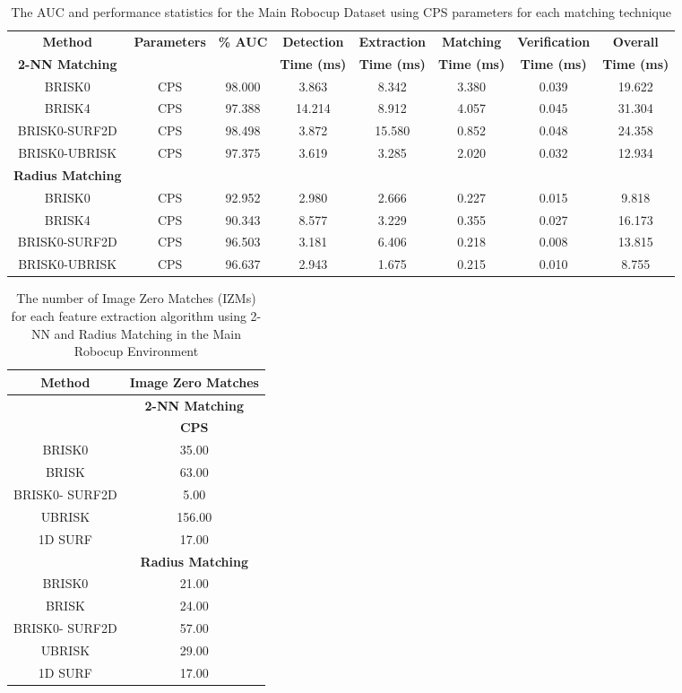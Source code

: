 \documentclass[11pt]{report}
\begin{document}
\begin{table}


\caption{The AUC and performance statistics for the Main Robocup Dataset using
CPS parameters for each matching technique}

\footnotesize
\begin{tabular}{|c|c|c|c|c|c|c|c|}
\hline 
\textbf{Method } & \textbf{Parameters} & \textbf{\% AUC} & \textbf{Detection} & \textbf{Extraction} & \textbf{Matching} & \textbf{Verification} & \textbf{Overall}\tabularnewline
\textbf{2-NN Matching} &  &  & \textbf{Time (ms)} & \textbf{Time (ms)} & \textbf{Time (ms)} & \textbf{Time (ms)} & \textbf{Time (ms)}\tabularnewline
\hline 
\hline 
BRISK0 & CPS & 98.000 & 3.863 & 8.342 & 3.380 & 0.039 & 19.622\tabularnewline
\hline 
BRISK4 & CPS & 97.388 & 14.214 & 8.912 & 4.057 & 0.045 & 31.304\tabularnewline
\hline 
BRISK0-SURF2D & CPS & 98.498 & 3.872 & 15.580 & 0.852 & 0.048 & 24.358\tabularnewline
\hline 
BRISK0-UBRISK & CPS & 97.375 & 3.619 & 3.285 & 2.020 & 0.032 & 12.934\tabularnewline
\hline 
\hline 
\textbf{Radius Matching} &  &  &  &  &  &  & \tabularnewline
\hline 
BRISK0 & CPS & 92.952 & 2.980 & 2.666 & 0.227 & 0.015 & 9.818\tabularnewline
\hline 
BRISK4 & CPS & 90.343 & 8.577 & 3.229 & 0.355 & 0.027 & 16.173\tabularnewline
\hline 
BRISK0-SURF2D & CPS & 96.503 & 3.181 & 6.406 & 0.218 & 0.008 & 13.815\tabularnewline
\hline 
BRISK0-UBRISK & CPS & 96.637 & 2.943 & 1.675 & 0.215 & 0.010 & 8.755\tabularnewline
\hline 
\end{tabular}
\label{app:mrd_times}
\end{table}

\begin{table}
\caption{The number of Image Zero Matches (IZMs) for each feature extraction
algorithm using 2-NN and Radius Matching in the Main Robocup Environment}
\begin{tabular}{|c|c|}
\hline 
\textbf{Method} & \multicolumn{1}{c|}{\textbf{Image Zero Matches}}\tabularnewline
\hline 
 & \multicolumn{1}{c|}{\textbf{2-NN Matching}}\tabularnewline
\hline 
 & \textbf{CPS}\tabularnewline
\hline 
\hline 
BRISK0 & 35.00\tabularnewline
\hline 
BRISK & 63.00\tabularnewline
\hline 
BRISK0- SURF2D & 5.00\tabularnewline
\hline 
UBRISK & 156.00\tabularnewline
\hline 
1D SURF & 17.00\tabularnewline
\hline 
 & \multicolumn{1}{c|}{\textbf{Radius Matching}}\tabularnewline
\hline 
BRISK0 & 21.00\tabularnewline
\hline 
BRISK & 24.00\tabularnewline
\hline 
BRISK0- SURF2D & 57.00\tabularnewline
\hline 
UBRISK & 29.00\tabularnewline
\hline 
1D SURF & 17.00\tabularnewline
\hline 
\end{tabular}
\label{app:mrd_izm}
\end{table}
\end{document}
